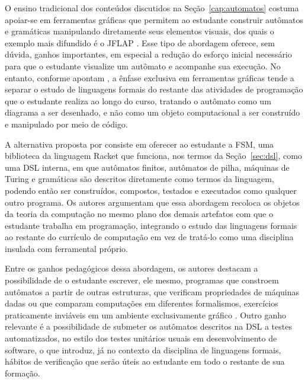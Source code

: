\documentclass[
    12pt
    ,oneside
    ,a4paper
    ,chapter=TITLE
    ,section=TITLE
    ,sumario=abnt-6027-2012]{abntex2}
\begin{document}
O ensino tradicional dos conteúdos discutidos na Seção~\ref{cap:automatos} costuma apoiar-se
em ferramentas gráficas que permitem ao estudante construir autômatos e gramáticas
manipulando diretamente seus elementos visuais, dos quais o exemplo mais difundido é o JFLAP
\cite{rodger2006jflap}. Esse tipo de abordagem oferece, sem dúvida, ganhos importantes, em
especial a redução do esforço inicial necessário para que o estudante visualize um autômato e
acompanhe sua execução. No entanto, conforme apontam , a
ênfase exclusiva em ferramentas gráficas tende a separar o estudo de linguagens formais do
restante das atividades de programação que o estudante realiza ao longo do curso, tratando o
autômato como um diagrama a ser desenhado, e não como um objeto computacional a ser construído
e manipulado por meio de código.

A alternativa proposta por  consiste em oferecer ao estudante a
FSM, uma biblioteca da linguagem Racket que funciona, nos termos da
Seção~\ref{sec:dsl}, como uma DSL interna, em que autômatos finitos, autômatos de pilha,
máquinas de Turing e gramáticas são descritos diretamente como termos da linguagem, podendo então ser construídos, compostos,
testados e executados como qualquer outro programa. Os autores argumentam que essa abordagem
recoloca os objetos da teoria da computação no mesmo plano dos demais artefatos com que o
estudante trabalha em programação, integrando o estudo das linguagens formais ao restante do
currículo de computação em vez de tratá-lo como uma disciplina insulada com ferramental próprio.

Entre os ganhos pedagógicos dessa abordagem, os autores destacam a possibilidade de o estudante
escrever, ele mesmo, programas que constroem autômatos a partir de outras estruturas, que
verificam propriedades de máquinas dadas ou que comparam computações em diferentes formalismos,
exercícios praticamente inviáveis em um ambiente exclusivamente gráfico \cite{morazan2014}.
Outro ganho relevante é a possibilidade de submeter os autômatos descritos na DSL a testes
automatizados, no estilo dos testes unitários usuais em desenvolvimento de software, o que
introduz, já no contexto da disciplina de linguagens formais, hábitos de verificação que serão
úteis ao estudante em todo o restante de sua formação.
\end{document}
